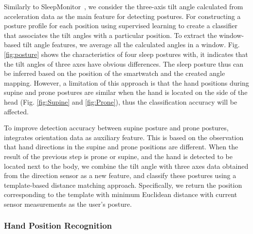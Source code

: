 
Similarly to SleepMonitor~\cite{sleepmonitor}, we consider the three-axis tilt angle calculated from acceleration data as the main  feature for detecting postures. For constructing a posture profile for each position using supervised learning to create a classifier that associates the tilt angles with a particular position. To extract the window-based tilt angle features, we average all the calculated angles in a window. Fig. \ref{fig:posture} shows the characteristics of four sleep postures with, it indicates that the tilt angles of three axes have obvious differences. The sleep posture thus can be inferred based on the position of the smartwatch and the created angle mapping. However, a limitation of this approach is that the hand positions during supine and prone postures are similar when the hand is located on the side of the head (Fig. \ref{fig:Supine} and \ref{fig:Prone}), thus the classification accuracy will be affected.

To improve detection accuracy between supine posture and prone postures, \systemname integrates orientation data as auxiliary feature. This is based on the observation that hand directions in the supine and prone positions are different. When the result of the previous step is prone or supine, and the hand is detected to be located next to the body, we combine the tilt angle with three axes data obtained from the direction sensor as a new feature, and classify these postures using a template-based distance matching approach. Specifically, we return the position corresponding to the template with minimum Euclidean distance with current sensor measurements as the user's posture. %


\subsubsection{Hand Position Recognition \label{sec:handpr}}

